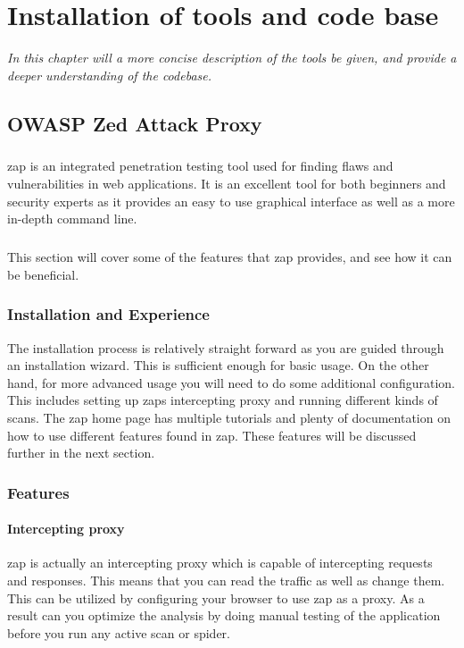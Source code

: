 \documentclass[11pt,english,a4paper]{report}
\begin{document}
\chapter{Installation of tools and code base}
\label{cha:part2}
\textit{In this chapter will a more concise description of the tools be given, and provide a deeper understanding of the codebase.}

\section{OWASP Zed Attack Proxy}
\paragraph{}
\gls{zap} is an integrated penetration testing tool used for finding flaws and vulnerabilities in web applications. 
It is an excellent tool for both beginners and security experts as it provides an easy to use graphical interface as well as a more in-depth command line.

\paragraph{}
This section will cover some of the features that \gls{zap} provides, and see how it can be beneficial.

\subsection{Installation and Experience}
The installation process is relatively straight forward as you are guided through an installation wizard. 
This is sufficient enough for basic usage. 
On the other hand, for more advanced usage you will need to do some additional configuration. 
This includes setting up \glspl{zap} intercepting proxy and running different kinds of scans. 
The \gls{zap} home page has multiple tutorials and plenty of documentation on how to use different features found in \gls{zap}. 
These features will be discussed further in the next section.

\subsection{Features}
\subsubsection{Intercepting proxy}
\gls{zap} is actually an intercepting proxy which is capable of intercepting requests and responses.
This means that you can read the traffic as well as change them.
This can be utilized by configuring your browser to use \gls{zap} as a proxy.
As a result can you optimize the analysis by doing manual testing of the application before you run any active scan or spider.
\end{document}
